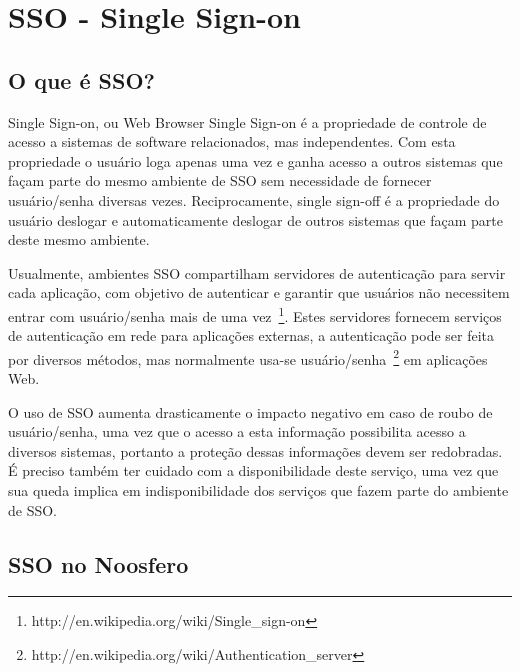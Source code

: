 \documentclass[11pt]{article}
\begin{document}
\lstset{language=Ruby}


\clearpage

\clearpage

\tableofcontents
\clearpage
\listoffigures

\clearpage



\section{SSO - Single Sign-on}

\subsection{O que é SSO?}

Single Sign-on, ou Web Browser Single Sign-on é a propriedade de controle de
acesso a sistemas de software relacionados, mas independentes. Com esta
propriedade o usuário loga apenas uma vez e ganha acesso a outros sistemas que
façam parte do mesmo ambiente de SSO sem necessidade de fornecer usuário/senha
diversas vezes. Reciprocamente, single sign-off é a propriedade do usuário
deslogar e automaticamente deslogar de outros sistemas que façam parte deste
mesmo ambiente.

Usualmente, ambientes SSO compartilham servidores de autenticação para servir
cada aplicação, com objetivo de autenticar e garantir que usuários não
necessitem entrar com usuário/senha mais de uma
vez~\footnote{http://en.wikipedia.org/wiki/Single\_sign-on}. Estes servidores
fornecem serviços de autenticação em rede para aplicações externas, a
autenticação pode ser feita por diversos métodos, mas normalmente usa-se
usuário/senha~\footnote{http://en.wikipedia.org/wiki/Authentication\_server} em
aplicações Web.

O uso de SSO aumenta drasticamente o impacto negativo em caso de roubo de
usuário/senha, uma vez que o acesso a esta informação possibilita acesso a
diversos sistemas, portanto a proteção dessas informações devem ser redobradas.
É preciso também ter cuidado com a disponibilidade deste serviço, uma vez
que sua queda implica em indisponibilidade dos serviços que fazem parte do
ambiente de SSO.

\subsection{SSO no Noosfero}
\end{document}
